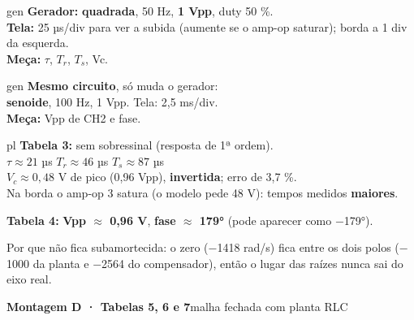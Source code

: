 \documentclass[10pt]{article}
\newcommand{\cabecalho}[3]{%
  \begin{tcolorbox}[enhanced, colback=#1!12, colframe=#1!70!black, boxrule=0pt, leftrule=6pt,
    arc=2pt, left=6pt, top=3pt, bottom=3pt]
  {\LARGE\bfseries #2}\hfill{\large #3}
  \end{tcolorbox}\vspace{-2pt}}
\begin{document}
\begin{minipage}[t]{0.27\linewidth}
\begin{caixa}{gen}
\textbf{Gerador:} \textbf{quadrada}, 50 Hz, \textbf{1 Vpp}, duty 50 \%.\\
\textbf{Tela:} 25 µs/div para ver a subida (aumente se o amp-op saturar); borda a 1 div da esquerda.\\
\textbf{Meça:} $\tau$, $T_r$, $T_s$, Vc.
\end{caixa}
\begin{caixa}{gen}
\textbf{Mesmo circuito}, só muda o gerador:\\
\textbf{senoide}, 100 Hz, 1 Vpp. Tela: 2,5 ms/div.\\
\textbf{Meça:} Vpp de CH2 e fase.
\end{caixa}
\end{minipage}\hfill
\begin{minipage}[t]{0.37\linewidth}
\begin{caixa}{pl}
\textbf{Tabela 3:} sem sobressinal (resposta de 1ª ordem).\\
$\tau \approx 21$ µs \quad $T_r \approx 46$ µs \quad $T_s \approx 87$ µs\\
$V_c \approx 0{,}48$ V de pico (0,96 Vpp), \textbf{invertida}; erro de 3,7 \%.\\
\footnotesize Na borda o amp-op 3 satura (o modelo pede 48 V): tempos medidos \textbf{maiores}.\normalsize

\smallskip
\textbf{Tabela 4:} \textbf{Vpp $\approx$ 0,96 V}, \textbf{fase $\approx$ 179°} (pode aparecer como $-$179°).

\smallskip\footnotesize Por que não fica subamortecida: o zero ($-$1418 rad/s) fica entre os dois polos
($-$1000 da planta e $-$2564 do compensador), então o lugar das raízes nunca sai do eixo real.
\end{caixa}
\end{minipage}

\newpage
\cabecalho{pl}{Montagem D · Tabelas 5, 6 e 7}{malha fechada com planta RLC}
\end{document}

